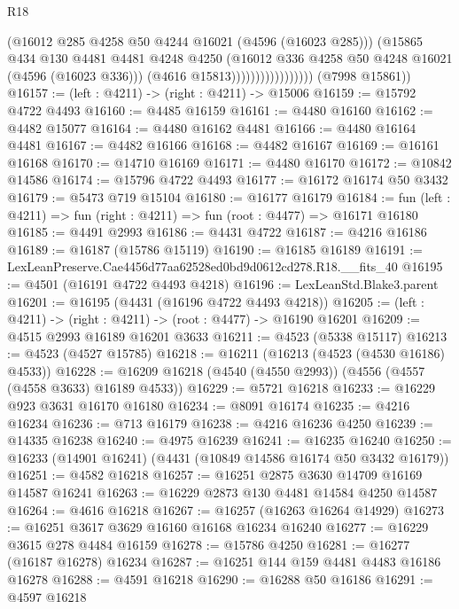 \begin{lexlean}{R18}
\begin{coremodule}
                                    (@16012 @285 @4258 @50 @4244 @16021 (@4596 (@16023 @285)))
                                    (@15865
                                      @434
                                      @130
                                      @4481
                                      @4481
                                      @4248
                                      @4250
                                      (@16012 @336 @4258 @50 @4248 @16021 (@4596 (@16023 @336)))
                                      (@4616 @15813)))))))))))))))))
      (@7998 @15861))
@16157 := (left : @4211) -> (right : @4211) -> @15006
@16159 := @15792 @4722 @4493
@16160 := @4485 @16159
@16161 := @4480 @16160
@16162 := @4482 @15077
@16164 := @4480 @16162 @4481
@16166 := @4480 @16164 @4481
@16167 := @4482 @16166
@16168 := @4482 @16167
@16169 := @16161 @16168
@16170 := @14710 @16169
@16171 := @4480 @16170
@16172 := @10842 @14586
@16174 := @15796 @4722 @4493
@16177 := @16172 @16174 @50 @3432
@16179 := @5473 @719 @15104
@16180 := @16177 @16179
@16184 := fun (left : @4211) => fun (right : @4211) => fun (root : @4477) => @16171 @16180
@16185 := @4491 @2993
@16186 := @4431 @4722
@16187 := @4216 @16186
@16189 := @16187 (@15786 @15119)
@16190 := @16185 @16189
@16191 := LexLeanPreserve.Cae4456d77aa62528ed0bd9d0612cd278.R18.__fits_40
@16195 := @4501 (@16191 @4722 @4493 @4218)
@16196 := LexLeanStd.Blake3.parent
@16201 := @16195 (@4431 (@16196 @4722 @4493 @4218))
@16205 := (left : @4211) -> (right : @4211) -> (root : @4477) -> @16190 @16201
@16209 := @4515 @2993 @16189 @16201 @3633
@16211 := @4523 (@5338 @15117)
@16213 := @4523 (@4527 @15785)
@16218 := @16211 (@16213 (@4523 (@4530 @16186) @4533))
@16228 := @16209 @16218 (@4540 (@4550 @2993)) (@4556 (@4557 (@4558 @3633) @16189 @4533))
@16229 := @5721 @16218
@16233 := @16229 @923 @3631 @16170 @16180
@16234 := @8091 @16174
@16235 := @4216 @16234
@16236 := @713 @16179
@16238 := @4216 @16236 @4250
@16239 := @14335 @16238
@16240 := @4975 @16239
@16241 := @16235 @16240
@16250 := @16233 (@14901 @16241) (@4431 (@10849 @14586 @16174 @50 @3432 @16179))
@16251 := @4582 @16218
@16257 := @16251 @2875 @3630 @14709 @16169 @14587 @16241
@16263 := @16229 @2873 @130 @4481 @14584 @4250 @14587
@16264 := @4616 @16218
@16267 := @16257 (@16263 @16264 @14929)
@16273 := @16251 @3617 @3629 @16160 @16168 @16234 @16240
@16277 := @16229 @3615 @278 @4484 @16159
@16278 := @15786 @4250
@16281 := @16277 (@16187 @16278) @16234
@16287 := @16251 @144 @159 @4481 @4483 @16186 @16278
@16288 := @4591 @16218
@16290 := @16288 @50 @16186
@16291 := @4597 @16218

\end{coremodule}
\end{lexlean}
